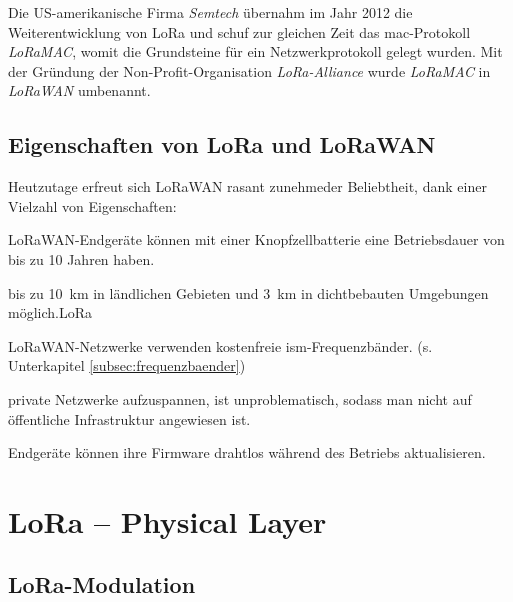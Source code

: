Die US-amerikanische Firma \emph{Semtech} übernahm im Jahr 2012 die Weiterentwicklung von LoRa und schuf zur gleichen Zeit das 
\acrshort{mac}-Protokoll \emph{LoRaMAC}, womit die Grundsteine für ein Netzwerkprotokoll gelegt wurden. 
Mit der Gründung der Non-Profit-Organisation \emph{LoRa-Alliance\textregistered} wurde \emph{LoRaMAC} in \emph{LoRaWAN} umbenannt. 

\subsection{Eigenschaften von LoRa und LoRaWAN}
\label{subsec:prop_lorawan}

Heutzutage erfreut sich LoRaWAN rasant zunehmeder Beliebtheit, dank einer Vielzahl von Eigenschaften: \cite{WhatAreLoRa}

\begin{description}[leftmargin=*, widest=Lizenzfreies Spektrum, nosep]
  \item[\textbf{Geringer Strombedarf:}] LoRaWAN-Endgeräte können mit einer Knopfzellbatterie eine Betriebsdauer von bis zu 10 Jahren haben.
  \item[\textbf{Große Reichweite:}]bis zu \SI{10}{\kilo\meter} in ländlichen Gebieten und \SI{3}{\kilo\meter} in dichtbebauten Umgebungen möglich.LoRa
  \item[\textbf{Lizenzfreies Spektrum:}] LoRaWAN-Netzwerke verwenden kostenfreie \acrshort{ism}-Frequenzbänder. (s. Unterkapitel \ref{subsec:frequenzbaender})
  \item[\textbf{Fleixibilität:}] private Netzwerke aufzuspannen, ist unproblematisch, sodass man nicht auf öffentliche Infrastruktur angewiesen ist.
  \item[\textbf{Over-the-Air-Updates:}] Endgeräte können ihre Firmware drahtlos während des Betriebs aktualisieren.
  \item 
\end{description}

\section{LoRa -- Physical Layer}
\label{sec:lora-physical}

\subsection{LoRa-Modulation}

